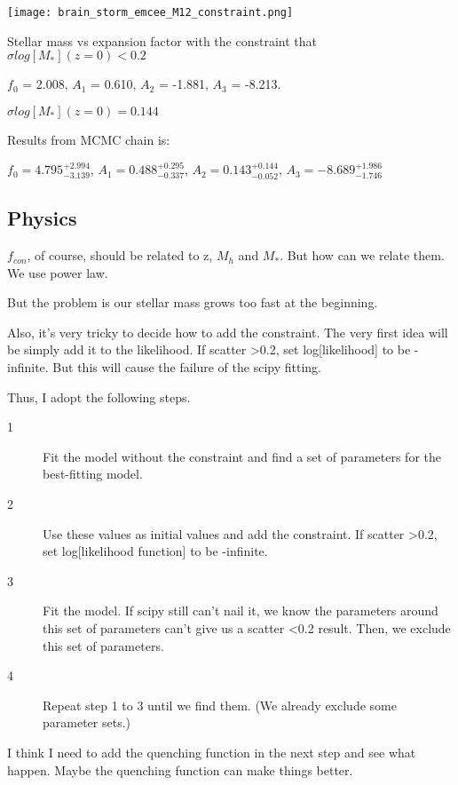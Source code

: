 \documentclass[ajp]{article}   	%
\begin{document}
\begin{center}
\texttt{[image: brain\_storm\_emcee\_M12\_constraint.png]}

\centerline{Stellar mass vs expansion factor with the constraint that $\sigma log[M_*](z=0) <0.2$}

\end{center}

$f_0$ = 2.008, $A_1$ = 0.610, $A_2$ = -1.881, $A_3$ = -8.213.

$\sigma log[M_*](z=0) =0.144$

\bigskip

Results from MCMC chain is:


$f_0=4.795^{+2.994}_{- 3.139}$, $A_1=0.488^{+0.295}_{-0.337}$, $A_2=0.143^{+0.144}_{-0.052}$, $A_3 = -8.689^{+1.986}_{-1.746}$


\subsection{Physics}

$f_{con}$, of course, should be related to z, $M_h$ and $M_*$. But how can we relate them. We use power law.

But the problem is our stellar mass grows too fast at the beginning.

Also, it's very tricky to decide how to add the constraint. The very first idea will be simply add it to the likelihood. If scatter >0.2, set log[likelihood] to be -infinite. But this will cause the failure of the scipy fitting.
\bigskip

Thus, I adopt the following steps.

\begin{description}
  \item[1] Fit the model without the constraint and find a set of parameters for the best-fitting model. 
  \item[2] Use these values as initial values and add the constraint. If scatter >0.2, set log[likelihood function] to be -infinite.
  \item[3] Fit the model. If scipy still can't nail it, we know the parameters around this set of parameters can't give us a scatter <0.2 result. Then, we exclude this set of parameters.
  \item[4] Repeat step 1 to 3 until we find them. (We already exclude some parameter sets.)
\end{description}
\bigskip

I think I need to add the quenching function in the next step and see what happen. Maybe the quenching function can make things better.
\end{document}
